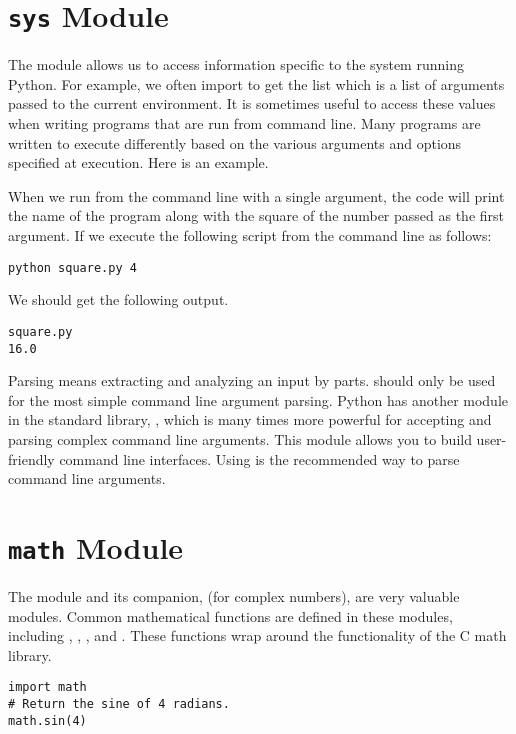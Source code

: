 \section*{\texttt{sys} Module}
The  module allows us to access information specific to the system running Python.
For example, we often import  to get the list  which is a list of arguments passed to the current environment.
It is sometimes useful to access these values when writing programs that are run from command line.
Many programs are written to execute differently based on the various arguments and options specified at execution.
Here is an example.


When we run from the command line with a single argument, the code will print the name of the program along with the square of the number passed as the first argument.
If we execute the following script from the command line as follows:
\begin{lstlisting}[style=ShellInput]
python square.py 4
\end{lstlisting}
We should get the following output.
\begin{lstlisting}[style=ShellOutput]
square.py
16.0
\end{lstlisting}

\begin{info}
Parsing means extracting and analyzing an input by parts.  should only be used for the most simple command line argument parsing.
Python has another module in the standard library, , which is many times more powerful for accepting and parsing complex command line arguments.  This module allows you to build user-friendly command line interfaces.  Using  is the recommended way to parse command line arguments.
\end{info}

\section*{\texttt{math} Module}
The  module and its companion,  (for complex numbers), are very valuable modules.
Common mathematical functions are defined in these modules, including , , , and .
These functions wrap around the functionality of the C math library.
\begin{lstlisting}
import math
# Return the sine of 4 radians.
math.sin(4)
\end{lstlisting}

